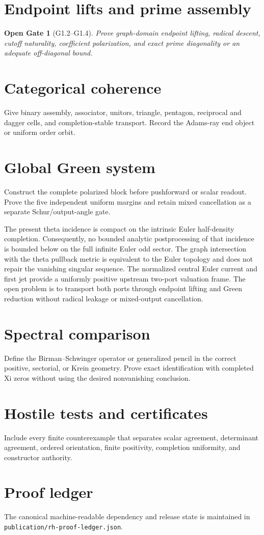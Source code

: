 \documentclass[11pt]{article}
\newtheorem{gate}[theorem]{Open Gate}
\begin{document}
\section{Endpoint lifts and prime assembly}
\begin{gate}[G1.2--G1.4]
Prove graph-domain endpoint lifting, radical descent, cutoff naturality, coefficient polarization, and exact prime diagonality or an adequate off-diagonal bound.
\end{gate}

\section{Categorical coherence}
Give binary assembly, associator, unitors, triangle, pentagon, reciprocal and dagger cells, and completion-stable transport. Record the Adams-ray end object or uniform order orbit.

\section{Global Green system}
Construct the complete polarized block before pushforward or scalar readout. Prove the five independent uniform margins and retain mixed cancellation as a separate Schur/output-angle gate.

The present theta incidence is compact on the intrinsic Euler half-density completion. Consequently, no bounded analytic postprocessing of that incidence is bounded below on the full infinite Euler odd sector. The graph intersection with the theta pullback metric is equivalent to the Euler topology and does not repair the vanishing singular sequence. The normalized central Euler current and first jet provide a uniformly positive upstream two-port valuation frame. The open problem is to transport both ports through endpoint lifting and Green reduction without radical leakage or mixed-output cancellation.

\section{Spectral comparison}
Define the Birman--Schwinger operator or generalized pencil in the correct positive, sectorial, or Krein geometry. Prove exact identification with completed Xi zeros without using the desired nonvanishing conclusion.

\section{Hostile tests and certificates}
Include every finite counterexample that separates scalar agreement, determinant agreement, ordered orientation, finite positivity, completion uniformity, and constructor authority.

\section{Proof ledger}
The canonical machine-readable dependency and release state is maintained in \texttt{publication/rh-proof-ledger.json}.
\end{document}
